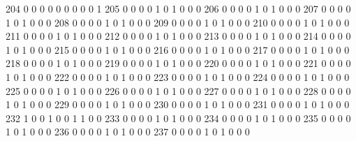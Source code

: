 \documentclass[compress,8pt]{beamer}
\begin{document}
\begin{frame}
\begin{Schunk}
  204      0       0   0              0        0    0       0       0   0   1
  205      0       0   0              0        1    0       1       0   0   0
  206      0       0   0              0        1    0       1       0   0   0
  207      0       0   0              0        1    0       1       0   0   0
  208      0       0   0              0        1    0       1       0   0   0
  209      0       0   0              0        1    0       1       0   0   0
  210      0       0   0              0        1    0       1       0   0   0
  211      0       0   0              0        1    0       1       0   0   0
  212      0       0   0              0        1    0       1       0   0   0
  213      0       0   0              0        1    0       1       0   0   0
  214      0       0   0              0        1    0       1       0   0   0
  215      0       0   0              0        1    0       1       0   0   0
  216      0       0   0              0        1    0       1       0   0   0
  217      0       0   0              0        1    0       1       0   0   0
  218      0       0   0              0        1    0       1       0   0   0
  219      0       0   0              0        1    0       1       0   0   0
  220      0       0   0              0        1    0       1       0   0   0
  221      0       0   0              0        1    0       1       0   0   0
  222      0       0   0              0        1    0       1       0   0   0
  223      0       0   0              0        1    0       1       0   0   0
  224      0       0   0              0        1    0       1       0   0   0
  225      0       0   0              0        1    0       1       0   0   0
  226      0       0   0              0        1    0       1       0   0   0
  227      0       0   0              0        1    0       1       0   0   0
  228      0       0   0              0        1    0       1       0   0   0
  229      0       0   0              0        1    0       1       0   0   0
  230      0       0   0              0        1    0       1       0   0   0
  231      0       0   0              0        1    0       1       0   0   0
  232      1       0   0              1        0    0       1       1   0   0
  233      0       0   0              0        1    0       1       0   0   0
  234      0       0   0              0        1    0       1       0   0   0
  235      0       0   0              0        1    0       1       0   0   0
  236      0       0   0              0        1    0       1       0   0   0
  237      0       0   0              0        1    0       1       0   0   0

\end{Schunk}
\end{frame}
\end{document}
